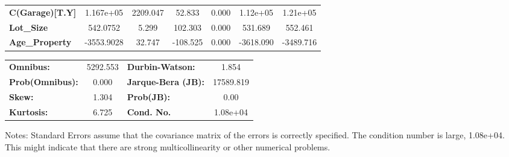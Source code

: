 \documentclass{report}
\begin{document}
\begin{center}
\begin{tabular}{lcccccc}
\textbf{C(Garage)[T.Y]}                      &    1.167e+05  &     2209.047     &    52.833  &         0.000        &     1.12e+05    &     1.21e+05     \\
\textbf{Lot\_Size}                           &     542.0752  &        5.299     &   102.303  &         0.000        &      531.689    &      552.461     \\
\textbf{Age\_Property}                       &   -3553.9028  &       32.747     &  -108.525  &         0.000        &    -3618.090    &    -3489.716     \\
\bottomrule
\end{tabular}
\begin{tabular}{lclc}
\textbf{Omnibus:}       & 5292.553 & \textbf{  Durbin-Watson:     } &     1.854  \\
\textbf{Prob(Omnibus):} &   0.000  & \textbf{  Jarque-Bera (JB):  } & 17589.819  \\
\textbf{Skew:}          &   1.304  & \textbf{  Prob(JB):          } &      0.00  \\
\textbf{Kurtosis:}      &   6.725  & \textbf{  Cond. No.          } &  1.08e+04  \\
\bottomrule
\end{tabular}
\end{center}

Notes: \newline
 [1] Standard Errors assume that the covariance matrix of the errors is correctly specified. \newline
 [2] The condition number is large, 1.08e+04. This might indicate that there are \newline
 strong multicollinearity or other numerical problems.
\end{document}
